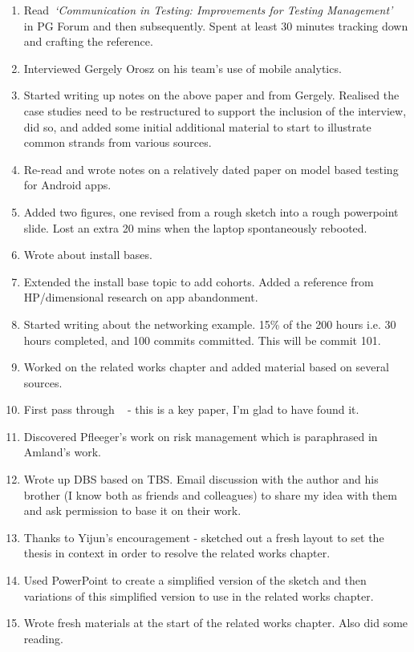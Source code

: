 \begin{enumerate}
    \item Read~\emph{`Communication in Testing: Improvements for Testing Management'}~\citep{paakkonen2009_communication_in_testing} in PG Forum and then subsequently. Spent at least 30 minutes tracking down and crafting the reference.
    \item Interviewed Gergely Orosz on his team's use of mobile analytics.
    \item Started writing up notes on the above paper and from Gergely. Realised the case studies need to be restructured to support the inclusion of the interview, did so, and added some initial additional material to start to illustrate common strands from various sources.
    \item Re-read and wrote notes on a relatively dated paper on model based testing for Android apps.
    \item Added two figures, one revised from a rough sketch into a rough powerpoint slide. Lost an extra 20 mins when the laptop spontaneously rebooted.
    \item Wrote about install bases.
    \item Extended the install base topic to add cohorts. Added a reference from HP/dimensional research on app abandonment.
    \item Started writing about the networking example. 15\% of the 200 hours i.e. 30 hours completed, and 100 commits committed. This will be commit 101.
    \item Worked on the related works chapter and added material based on several sources.
    \item First pass through ~\citep{avizienis2004_basic_concepts_and_taxonomy} - this is a key paper, I'm glad to have found it.
    \item Discovered Pfleeger's work on risk management which is paraphrased in Amland's work.
    \item Wrote up DBS based on TBS. Email discussion with the author and his brother (I know both as friends and colleagues) to share my idea with them and ask permission to base it on their work.
    \item Thanks to Yijun's encouragement - sketched out a fresh layout to set the thesis in context in order to resolve the related works chapter.
    \item Used PowerPoint to create a simplified version of the sketch and then variations of this simplified version to use in the related works chapter. 
    \item Wrote fresh materials at the start of the related works chapter. Also did some reading.

\end{enumerate}
